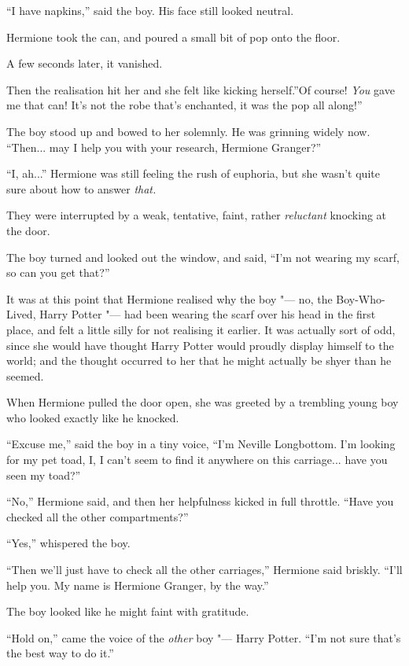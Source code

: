 ``I have napkins,'' said the boy. His face still looked neutral.

Hermione took the can, and poured a small bit of pop onto the floor.

A few seconds later, it vanished.

Then the realisation hit her and she felt like kicking herself.''Of
course! \emph{You} gave me that can! It's not the robe that's enchanted,
it was the pop all along!''

The boy stood up and bowed to her solemnly. He was grinning widely now.
``Then... may I help you with your research, Hermione Granger?''

``I, ah...'' Hermione was still feeling the rush of euphoria, but
she wasn't quite sure about how to answer \emph{that.}

They were interrupted by a weak, tentative, faint, rather
\emph{reluctant} knocking at the door.

The boy turned and looked out the window, and said, ``I'm not wearing my
scarf, so can you get that?''

It was at this point that Hermione realised why the boy "--- no, the
Boy-Who-Lived, Harry Potter "--- had been wearing the scarf over his head
in the first place, and felt a little silly for not realising it
earlier. It was actually sort of odd, since she would have thought Harry
Potter would proudly display himself to the world; and the thought
occurred to her that he might actually be shyer than he seemed.

When Hermione pulled the door open, she was greeted by a trembling young
boy who looked exactly like he knocked.

``Excuse me,'' said the boy in a tiny voice, ``I'm Neville Longbottom.
I'm looking for my pet toad, I, I can't seem to find it anywhere on this
carriage... have you seen my toad?''

``No,'' Hermione said, and then her helpfulness kicked in full throttle.
``Have you checked all the other compartments?''

``Yes,'' whispered the boy.

``Then we'll just have to check all the other carriages,'' Hermione said
briskly. ``I'll help you. My name is Hermione Granger, by the way.''

The boy looked like he might faint with gratitude.

``Hold on,'' came the voice of the \emph{other} boy "--- Harry Potter.
``I'm not sure that's the best way to do it.''

